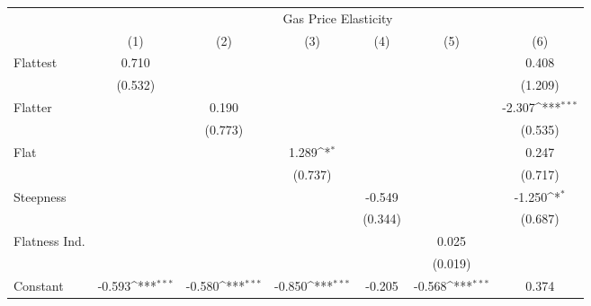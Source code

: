 {
\def\sym#1{\ifmmode^{#1}\else\(^{#1}\)\fi}
\begin{tabular}{l*{6}{c}}
\hline\hline
            &\multicolumn{6}{c}{Gas Price Elasticity}                                                                                           \\
            &\multicolumn{1}{c}{(1)}         &\multicolumn{1}{c}{(2)}         &\multicolumn{1}{c}{(3)}         &\multicolumn{1}{c}{(4)}         &\multicolumn{1}{c}{(5)}         &\multicolumn{1}{c}{(6)}         \\
\hline
Flattest    &       0.710         &                     &                     &                     &                     &       0.408         \\
            &     (0.532)         &                     &                     &                     &                     &     (1.209)         \\
[1em]
Flatter     &                     &       0.190         &                     &                     &                     &      -2.307\sym{***}\\
            &                     &     (0.773)         &                     &                     &                     &     (0.535)         \\
[1em]
Flat        &                     &                     &       1.289\sym{*}  &                     &                     &       0.247         \\
            &                     &                     &     (0.737)         &                     &                     &     (0.717)         \\
[1em]
Steepness   &                     &                     &                     &      -0.549         &                     &      -1.250\sym{*}  \\
            &                     &                     &                     &     (0.344)         &                     &     (0.687)         \\
[1em]
Flatness Ind.&                     &                     &                     &                     &       0.025         &                     \\
            &                     &                     &                     &                     &     (0.019)         &                     \\
[1em]
Constant    &      -0.593\sym{***}&      -0.580\sym{***}&      -0.850\sym{***}&      -0.205         &      -0.568\sym{***}&       0.374         \\

\end{tabular}}

